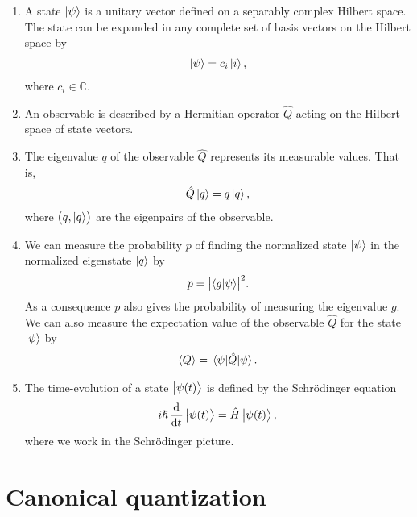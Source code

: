         \begin{enumerate}
            \item A state $\ket{\psi}$ is a unitary vector defined on a
                separably complex Hilbert space.
                The state can be expanded in any complete set of basis vectors
                on the Hilbert space by
                \begin{align}
                    \ket{\psi} = c_i\ket{i},
                \end{align}
                where $c_i \in \mathbb{C}$.
            \item An observable is described by a Hermitian operator $\hat{Q}$
                acting on the Hilbert space of state vectors.
            \item The eigenvalue $q$ of the observable $\hat{Q}$ represents its
                measurable values.
                That is,
                \begin{align}
                    \hat{Q}\ket{q} = q\ket{q},
                \end{align}
                where $\left( q, \ket{q} \right)$ are the eigenpairs of the observable.
            \item We can measure the probability $p$ of finding the normalized
                state $\ket{\psi}$ in the normalized eigenstate $\ket{q}$ by
                \begin{align}
                    p = \abs{\braket{g}{\psi}}^2.
                \end{align}
                As a consequence $p$ also gives the probability of measuring the
                eigenvalue $g$.
                We can also measure the expectation value of the observable
                $\hat{Q}$ for the state $\ket{\psi}$ by
                \begin{align}
                    \left\langle Q \right\rangle = \mel{\psi}{\hat{Q}}{\psi}.
                \end{align}
            \item The time-evolution of a state $\ket{\psi(t)}$ is defined by
                the Schrödinger equation
                \begin{align}
                    i\hslash \dod[]{}{t}\ket{\psi(t)} = \hamil\ket{\psi(t)},
                \end{align}
                where we work in the Schrödinger picture.
        \end{enumerate}

    \section{Canonical quantization}
